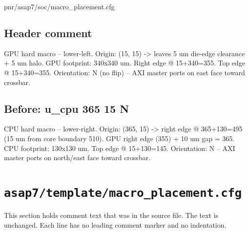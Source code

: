 \begin{relocated}{pnr/asap7/soc/macro_placement.cfg}
\subsection*{Header comment}

\begin{textblock}
GPU hard macro -- lower-left.
Origin: (15, 15) -> leaves 5 um die-edge clearance + 5 um halo.
GPU footprint: 340x340 um.  Right edge @ 15+340=355.  Top edge @ 15+340=355.
Orientation: N (no flip) -- AXI master ports on east face toward crossbar.
\end{textblock}

\subsection*{Before: u\_cpu 365 15 N}

\begin{textblock}
CPU hard macro -- lower-right.
Origin: (365, 15) -> right edge @ 365+130=495 (15 um from core boundary 510).
GPU right edge (355) + 10 um gap = 365.  CPU footprint: 130x130 um.
Top edge @ 15+130=145.
Orientation: N -- AXI master ports on north/east face toward crossbar.
\end{textblock}

\end{relocated}

\section{\texttt{asap7/template/macro\_placement.cfg}}\label{tm:pd:asap7-template-macro-placement-cfg}

This section holds comment text that was in the source file. The text is unchanged. Each line has no leading comment marker and no indentation.

